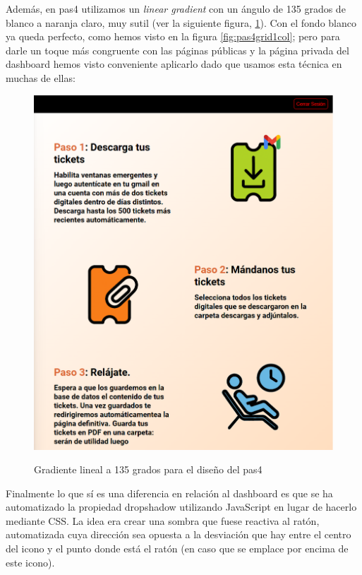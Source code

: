 \documentclass[a4paper,12pt]{report}
\begin{document}
	Además, en pas4 utilizamos un \textit{linear gradient} con un ángulo de 135 grados de blanco a naranja claro, muy sutil (ver la siguiente figura, \ref{fig:gradientlineal135grauspas4}). Con el fondo blanco ya queda perfecto, como hemos visto en la figura \ref{fig:pas4grid1col}; pero para darle un toque más congruente con las páginas públicas y la página privada del dashboard hemos visto conveniente aplicarlo dado que usamos esta técnica en muchas de ellas:
	
	\FloatBarrier
	\begin{figure}[H]
		\centering
		\caption{Gradiente lineal a 135 grados para el diseño del pas4}
		\includegraphics[width=1\linewidth]{img/gradientLineal135grausPas4}
		\label{fig:gradientlineal135grauspas4}
	\end{figure}
	\FloatBarrier
	
	
	Finalmente lo que sí es una diferencia en relación al dashboard es que se ha automatizado la propiedad dropshadow utilizando JavaScript en lugar de hacerlo mediante CSS. La idea era crear una sombra que fuese reactiva al ratón, automatizada cuya dirección sea opuesta a la desviación que hay entre el centro del icono y el punto donde está el ratón (en caso que se emplace por encima de este icono).
	
\end{document}
